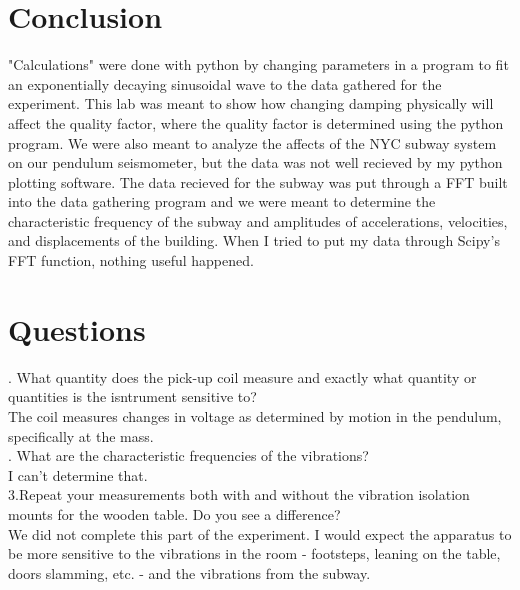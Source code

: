 \documentclass[12pt]{article}
\begin{document}
\section{Conclusion}
\indent \indent "Calculations" were done with python by changing parameters in a program to fit an exponentially decaying sinusoidal wave to the data gathered for the experiment. This lab was meant to show how changing damping physically will affect the quality factor, where the quality factor is determined using the python program. We were also meant to analyze the affects of the NYC subway system on our pendulum seismometer, but the data was not well recieved by my python plotting software. The data recieved for the subway was put through a FFT built into the data gathering program and we were meant to determine the characteristic frequency of the subway and amplitudes of accelerations, velocities, and displacements of the building. When I tried to put my data through Scipy's FFT function, nothing useful happened.

\section{Questions}
\indent {}. What quantity does the pick-up coil measure and exactly what quantity or quantities is the isntrument sensitive to? \\
\indent The coil measures changes in voltage as determined by motion in the pendulum, specifically at the mass.\\
. What are the characteristic frequencies of the vibrations? \\
\indent I can't determine that.\\
\indent 3.Repeat your measurements both with and without the vibration isolation mounts for the wooden table. Do you see a difference? \\
\indent We did not complete this part of the experiment. I would expect the apparatus to be more sensitive to the vibrations in the room - footsteps, leaning on the table, doors slamming, etc. - and the vibrations from the subway.
\end{document}
